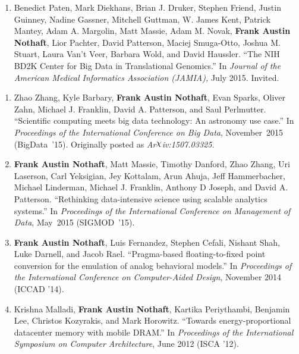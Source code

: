 \documentclass[10pt]{article} %
\newcounter{pubCtr}
\begin{document}
\begin {minipage}[t]{0.2\linewidth}
\vspace{0pt}
\end {minipage}
\begin {minipage}[t]{0.8\linewidth}
\vspace{0pt}


\setdefaultleftmargin{13pt}{}{}{}{}{}
\begin{enumerate}
\item Benedict Paten, Mark Diekhans, Brian J. Druker, Stephen Friend,
Justin Guinney, Nadine Gassner, Mitchell Guttman, W. James Kent, Patrick Mantey,
Adam A. Margolin, Matt Massie, Adam M. Novak, \textbf{Frank Austin Nothaft},
Lior Pachter, David Patterson, Maciej Smuga-Otto, Joshua M. Stuart,
Laura Van’t Veer, Barbara Wold, and David Haussler. ``The NIH BD2K Center for
Big Data in Translational Genomics.'' In \emph{Journal of the American Medical
Informatics Association (JAMIA),} July 2015. Invited.
\setcounter{pubCtr}{\theenumi}
\end{enumerate}


\begin{enumerate}
\setcounter{enumi}{\thepubCtr}
\item {Zhao Zhang, Kyle Barbary, \textbf{Frank Austin Nothaft}, Evan Sparks, Oliver Zahn,
Michael J. Franklin, David A. Patterson, and Saul Perlmutter. ``Scientific computing meets big data
technology: An astronomy use case.'' In \emph{Proceedings of the International Conference on
Big Data}, November~2015 (BigData~'15). Originally posted as \emph{Ar$\raisebox{2pt}{$\chi$}$iv:1507.03325.}}
\item {\textbf{Frank Austin Nothaft}, Matt Massie, Timothy Danford, Zhao Zhang,
Uri Laserson, Carl Yeksigian, Jey Kottalam, Arun Ahuja, Jeff Hammerbacher,
Michael Linderman, Michael J. Franklin, Anthony D Joseph, and David A. Patterson.
``Rethinking data-intensive science using scalable analytics systems.'' In
\emph{Proceedings of the International Conference on Management of Data},
May~2015 (SIGMOD~'15).}
\item {\textbf{Frank Austin Nothaft}, Luis Fernandez, Stephen Cefali, Nishant Shah, Luke Darnell,
and Jacob Rael. ``Pragma-based floating-to-fixed point conversion for the emulation of analog
behavioral models.'' In \emph{Proceedings of the International Conference on Computer-Aided Design},
November 2014 (ICCAD '14).}
\item {Krishna Malladi, \textbf{Frank Austin Nothaft}, Kartika Periythambi, Benjamin Lee, 
Christos Kozyrakis, and Mark Horowitz. ``Towards energy-proportional datacenter memory with mobile DRAM.''
In \emph{Proceedings of the International Symposium on Computer Architecture}, June 2012 (ISCA '12).}
\setcounter{pubCtr}{\theenumi}
\end{enumerate}

\end{minipage}
\end{document}
